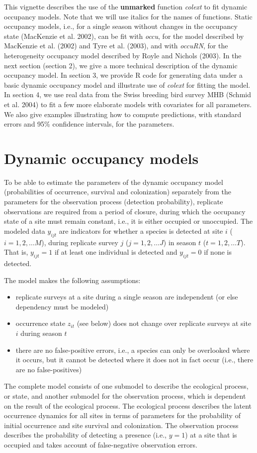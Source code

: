 \documentclass[12pt]{article}
\begin{document}
This vignette describes the use of the \textbf{unmarked} function
\emph{colext} to fit dynamic occupancy models. Note that we will use
italics for the names of functions.
Static occupancy models, i.e., for a single season without changes in
the occupancy state (MacKenzie et al. 2002), can be fit with \emph{occu},
for the model described by MacKenzie et al. (2002) and Tyre et
al. (2003), and with \emph{occuRN}, for the heterogeneity occupancy model
described by Royle and Nichols (2003).
In the next section (section 2), we give a more technical description
of the dynamic occupancy model.
In section 3, we provide R code for generating data under a basic
dynamic occupancy model and illustrate use of \emph{colext} for fitting the
model.
In section 4, we use real data from the Swiss breeding bird survey MHB
(Schmid et al. 2004) to fit a few more elaborate models with
covariates for all parameters.
We also give examples illustrating how to compute predictions, with
standard errors and 95\% confidence intervals, for the parameters.




\section{Dynamic occupancy models}
To be able to estimate the parameters of the dynamic occupancy model
(probabilities of occurrence, survival and colonization) separately
from the parameters for the observation process (detection
probability), replicate observations are required from a period of
closure,
during which the occupancy state of a site must remain constant, i.e.,
it is either occupied or unoccupied.
The modeled data $y_{ijt}$ are indicators for whether a species is
detected at site $i$ ($i = 1, 2, \ldots M$), during replicate survey
$j$ ($j = 1, 2, \ldots J$) in season $t$ ($t = 1, 2, \ldots T$).
That is, $y_{ijt}=1$ if at least one individual is detected and
$y_{ijt}=0$ if none is detected.

The model makes the following assumptions:
\begin{itemize}
\item replicate surveys at a site during a single season are
  independent (or else dependency must be modeled)
\item occurrence state $z_{it}$ (see below) does not change over
  replicate surveys at site $i$ during season $t$
\item there are no false-positive errors, i.e., a species can only be
  overlooked where it occurs, but it cannot be detected where it does
  not in fact occur (i.e., there are no false-positives)
\end{itemize}
The complete model consists of one submodel to describe the ecological
process, or state, and another submodel for the observation process,
which is dependent on the result of the ecological process.
The ecological process describes the latent occurrence dynamics for
all sites in terms of parameters for the probability of initial
occurrence and site survival and colonization.
The observation process describes the probability of detecting a
presence (i.e., $y = 1$) at a site that is occupied and takes account
of false-negative observation errors.
\end{document}
